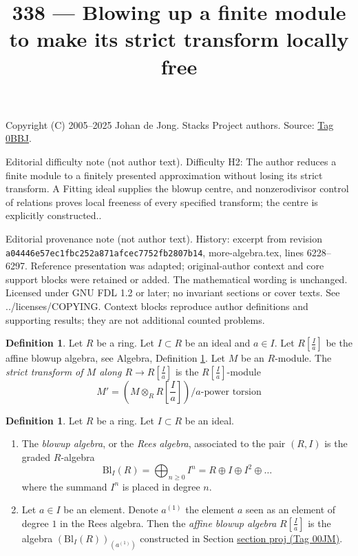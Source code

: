 \documentclass{amsart}
\theoremstyle{plain}
\theoremstyle{definition}
\newtheorem{definition}[subsection]{Definition}
\theoremstyle{remark}
\numberwithin{equation}{subsection}
\begin{document}
\title[Stacks Project, Tag 0BBJ]{338 --- Blowing up a finite module to make its strict transform locally free}
\maketitle
\noindent Copyright (C) 2005--2025 Johan de Jong. Stacks Project authors. Source: \href{https://stacks.math.columbia.edu/tag/0BBJ}{Tag 0BBJ}.

\noindent Editorial difficulty note (not author text). Difficulty H2: The author reduces a finite module to a finitely presented approximation without losing its strict transform. A Fitting ideal supplies the blowup centre, and nonzerodivisor control of relations proves local freeness of every specified transform; the centre is explicitly constructed..

\noindent Editorial provenance note (not author text). History: excerpt from revision \texttt{a0444\allowbreak 6e57e\allowbreak c1fbc\allowbreak 252a8\allowbreak 71afc\allowbreak ec775\allowbreak 2fb28\allowbreak 07b14}, more-algebra.tex, lines 6228--6297. Reference presentation was adapted; original-author context and core support blocks were retained or added. The mathematical wording is unchanged. Licensed under GNU FDL 1.2 or later; no invariant sections or cover texts. See ../licenses/COPYING. Context blocks reproduce author definitions and supporting results; they are not additional counted problems.

\begin{definition}
\label{definition-strict-transform}
Let $R$ be a ring. Let $I \subset R$ be an ideal and $a \in I$.
Let $R[\frac{I}{a}]$ be the affine blowup algebra, see
Algebra, Definition \ref{algebra-definition-blow-up}.
Let $M$ be an $R$-module.
The {\it strict transform of $M$ along $R \to R[\frac{I}{a}]$} is
the $R[\frac{I}{a}]$-module
$$
M' = \left(M \otimes_R R[\textstyle{\frac{I}{a}}]\right)/a\text{-power torsion}
$$
\end{definition}

\begin{definition}
\label{algebra-definition-blow-up}
Let $R$ be a ring.
Let $I \subset R$ be an ideal.
\begin{enumerate}
\item The {\it blowup algebra}, or the {\it Rees algebra}, associated to
the pair $(R, I)$ is the graded $R$-algebra
$$
\text{Bl}_I(R) =
\bigoplus\nolimits_{n \geq 0} I^n =
R \oplus I \oplus I^2 \oplus \ldots
$$
where the summand $I^n$ is placed in degree $n$.
\item Let $a \in I$ be an element. Denote $a^{(1)}$ the element $a$
seen as an element of degree $1$ in the Rees algebra. Then the
{\it affine blowup algebra} $R[\frac{I}{a}]$ is the algebra
$(\text{Bl}_I(R))_{(a^{(1)})}$ constructed in Section \href{https://stacks.math.columbia.edu/tag/00JM}{section proj (Tag 00JM)}.
\end{enumerate}
\end{definition}
\end{document}
